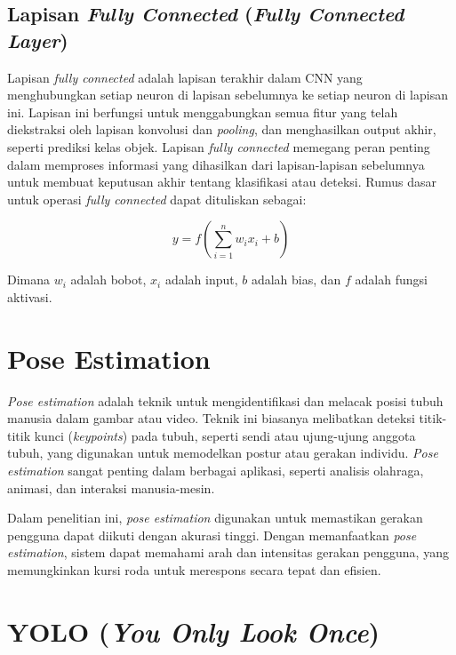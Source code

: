 \subsection{Lapisan \emph{Fully Connected} (\emph{Fully Connected Layer})}
\label{subsec:Fully Connected Layer}

Lapisan \emph{fully connected} adalah lapisan terakhir dalam CNN yang menghubungkan setiap neuron di lapisan sebelumnya ke setiap neuron di lapisan ini. Lapisan ini berfungsi untuk menggabungkan semua fitur yang telah diekstraksi oleh lapisan konvolusi dan \emph{pooling}, dan menghasilkan output akhir, seperti prediksi kelas objek. Lapisan \emph{fully connected} memegang peran penting dalam memproses informasi yang dihasilkan dari lapisan-lapisan sebelumnya untuk membuat keputusan akhir tentang klasifikasi atau deteksi. Rumus dasar untuk operasi \emph{fully connected} dapat dituliskan sebagai:

\begin{equation}
  y = f\left(\sum_{i=1}^{n} w_i x_i + b\right)
\end{equation}

Dimana \( w_i \) adalah bobot, \( x_i \) adalah input, \( b \) adalah bias, dan \( f \) adalah fungsi aktivasi.

\section{Pose Estimation}
\label{sec:Pose Estimation}

\emph{Pose estimation} adalah teknik untuk mengidentifikasi dan melacak posisi tubuh manusia dalam gambar atau video. Teknik ini biasanya melibatkan deteksi titik-titik kunci (\emph{keypoints}) pada tubuh, seperti sendi atau ujung-ujung anggota tubuh, yang digunakan untuk memodelkan postur atau gerakan individu. \emph{Pose estimation} sangat penting dalam berbagai aplikasi, seperti analisis olahraga, animasi, dan interaksi manusia-mesin.

Dalam penelitian ini, \emph{pose estimation} digunakan untuk memastikan gerakan pengguna dapat diikuti dengan akurasi tinggi. Dengan memanfaatkan \emph{pose estimation}, sistem dapat memahami arah dan intensitas gerakan pengguna, yang memungkinkan kursi roda untuk merespons secara tepat dan efisien.

\section{YOLO (\emph{You Only Look Once})}
\label{sec:YOLO}

